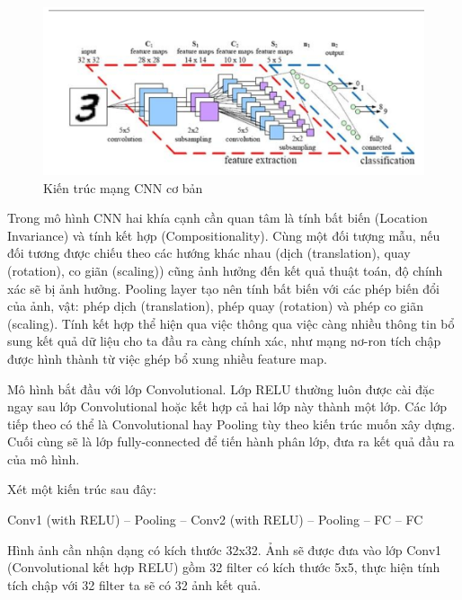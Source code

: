 \begin{center}
    \begin{figure}[h!]
    \begin{center}
     \includegraphics[scale=0.5]{img/basiccnn1.png}
    \end{center}
    \caption{Kiến trúc mạng CNN cơ bản \cite{mangcnn} } 
    \label{refhinh8}
    \end{figure}
\end{center}

Trong mô hình CNN hai khía cạnh cần quan tâm là tính bất biến (Location Invariance) và tính kết hợp (Compositionality). Cùng một đối tượng mẫu, nếu đối tương được chiếu theo các hướng khác nhau (dịch (translation), quay (rotation), co giãn (scaling)) cũng ảnh hưởng đến kết quả thuật toán, độ chính xác sẽ bị ảnh hưởng. Pooling layer tạo nên tính bất biến với các phép biến đổi của ảnh, vật: phép dịch (translation), phép quay (rotation) và phép co giãn (scaling). Tính kết hợp thể hiện qua việc thông qua việc càng nhiều thông tin bổ sung kết quả dữ liệu cho ta đầu ra càng chính xác, như mạng nơ-ron tích chập được hình thành từ việc ghép bổ xung nhiều feature map.

Mô hình bắt đầu với lớp Convolutional. Lớp RELU thường luôn được cài đặc ngay sau lớp Convolutional hoặc kết hợp cả hai lớp này thành một lớp. Các lớp tiếp theo có thể là Convolutional hay Pooling tùy theo kiến trúc muốn xây dựng. Cuối cùng sẽ là lớp fully-connected để tiến hành phân lớp, đưa ra kết quả đầu ra của mô hình.

Xét một kiến trúc sau đây:

Conv1 (with RELU) – Pooling – Conv2 (with RELU) – Pooling – FC – FC

Hình ảnh cần nhận dạng có kích thước 32x32. Ảnh sẽ được đưa vào lớp Conv1 (Convolutional kết hợp RELU) gồm 32 filter có kích thước 5x5, thực hiện tính tích chập với 32 filter ta sẽ có 32 ảnh kết quả.

